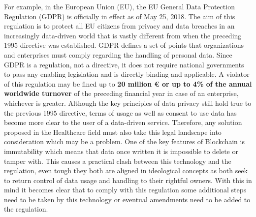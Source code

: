 For example, in the European Union (EU), the EU General Data Protection
Regulation (GDPR) is officially in effect as of May 25, 2018. The aim of this
regulation is to protect all EU citizens from privacy and data breaches in an
increasingly data-driven world that is vastly different from when the preceding
1995 directive was established. GDPR defines a set of points that organizations
and enterprises must comply regarding the handling of personal data. Since GDPR
is a regulation, not a directive, it does not require national governments to
pass any enabling legislation and is directly binding and applicable. A
violator of this regulation may be fined up to \textbf{20 million € or up to
4\% of the annual worldwide turnover} of the preceding financial year in case
of an enterprise, whichever is greater. Although the key principles of data
privacy still hold true to the previous 1995 directive, terms of usage as well
as consent to use data has become more clear to the user of a data-driven
service.  Therefore, any solution proposed in the Healthcare field must also
take this legal landscape into consideration which may be a problem. One of the
key features of Blockchain is immutability which means that data once written
it is impossible to delete or tamper with. This causes a practical clash
between this technology and the regulation, even tough they both are aligned in
ideological concepts as both seek to return control of data usage and handling
to their rightful owners. With this in mind it becomes clear that to comply
with this regulation some additional steps need to be taken by this technology
or eventual amendments need to be added to the regulation.
